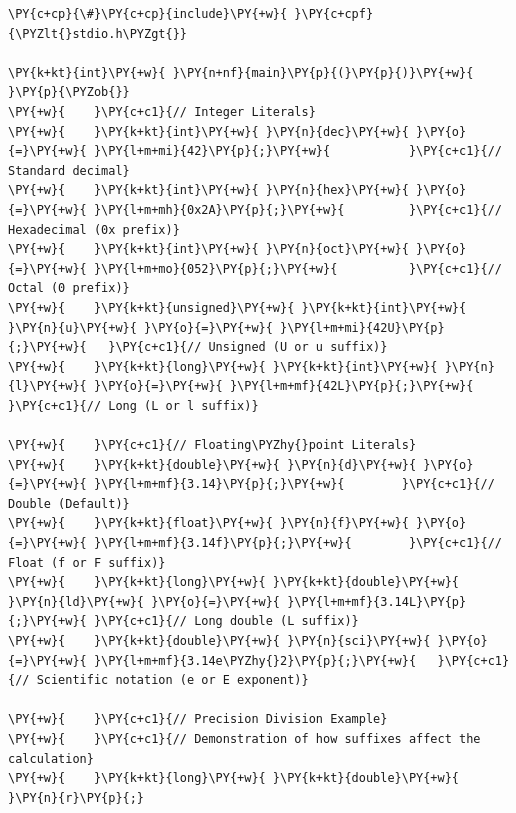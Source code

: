 \begin{Verbatim}[label=\makebox{\url{https://github.com/lucabaldini/cmepda/tree/master/slides/latex/snippets/literals_and_precision.c}},commandchars=\\\{\}]
\PY{c+cp}{\#}\PY{c+cp}{include}\PY{+w}{ }\PY{c+cpf}{\PYZlt{}stdio.h\PYZgt{}}

\PY{k+kt}{int}\PY{+w}{ }\PY{n+nf}{main}\PY{p}{(}\PY{p}{)}\PY{+w}{ }\PY{p}{\PYZob{}}
\PY{+w}{    }\PY{c+c1}{// Integer Literals}
\PY{+w}{    }\PY{k+kt}{int}\PY{+w}{ }\PY{n}{dec}\PY{+w}{ }\PY{o}{=}\PY{+w}{ }\PY{l+m+mi}{42}\PY{p}{;}\PY{+w}{           }\PY{c+c1}{// Standard decimal}
\PY{+w}{    }\PY{k+kt}{int}\PY{+w}{ }\PY{n}{hex}\PY{+w}{ }\PY{o}{=}\PY{+w}{ }\PY{l+m+mh}{0x2A}\PY{p}{;}\PY{+w}{         }\PY{c+c1}{// Hexadecimal (0x prefix)}
\PY{+w}{    }\PY{k+kt}{int}\PY{+w}{ }\PY{n}{oct}\PY{+w}{ }\PY{o}{=}\PY{+w}{ }\PY{l+m+mo}{052}\PY{p}{;}\PY{+w}{          }\PY{c+c1}{// Octal (0 prefix)}
\PY{+w}{    }\PY{k+kt}{unsigned}\PY{+w}{ }\PY{k+kt}{int}\PY{+w}{ }\PY{n}{u}\PY{+w}{ }\PY{o}{=}\PY{+w}{ }\PY{l+m+mi}{42U}\PY{p}{;}\PY{+w}{   }\PY{c+c1}{// Unsigned (U or u suffix)}
\PY{+w}{    }\PY{k+kt}{long}\PY{+w}{ }\PY{k+kt}{int}\PY{+w}{ }\PY{n}{l}\PY{+w}{ }\PY{o}{=}\PY{+w}{ }\PY{l+m+mf}{42L}\PY{p}{;}\PY{+w}{       }\PY{c+c1}{// Long (L or l suffix)}

\PY{+w}{    }\PY{c+c1}{// Floating\PYZhy{}point Literals}
\PY{+w}{    }\PY{k+kt}{double}\PY{+w}{ }\PY{n}{d}\PY{+w}{ }\PY{o}{=}\PY{+w}{ }\PY{l+m+mf}{3.14}\PY{p}{;}\PY{+w}{        }\PY{c+c1}{// Double (Default)}
\PY{+w}{    }\PY{k+kt}{float}\PY{+w}{ }\PY{n}{f}\PY{+w}{ }\PY{o}{=}\PY{+w}{ }\PY{l+m+mf}{3.14f}\PY{p}{;}\PY{+w}{        }\PY{c+c1}{// Float (f or F suffix)}
\PY{+w}{    }\PY{k+kt}{long}\PY{+w}{ }\PY{k+kt}{double}\PY{+w}{ }\PY{n}{ld}\PY{+w}{ }\PY{o}{=}\PY{+w}{ }\PY{l+m+mf}{3.14L}\PY{p}{;}\PY{+w}{ }\PY{c+c1}{// Long double (L suffix)}
\PY{+w}{    }\PY{k+kt}{double}\PY{+w}{ }\PY{n}{sci}\PY{+w}{ }\PY{o}{=}\PY{+w}{ }\PY{l+m+mf}{3.14e\PYZhy{}2}\PY{p}{;}\PY{+w}{   }\PY{c+c1}{// Scientific notation (e or E exponent)}

\PY{+w}{    }\PY{c+c1}{// Precision Division Example}
\PY{+w}{    }\PY{c+c1}{// Demonstration of how suffixes affect the calculation}
\PY{+w}{    }\PY{k+kt}{long}\PY{+w}{ }\PY{k+kt}{double}\PY{+w}{ }\PY{n}{r}\PY{p}{;}


\end{Verbatim}
